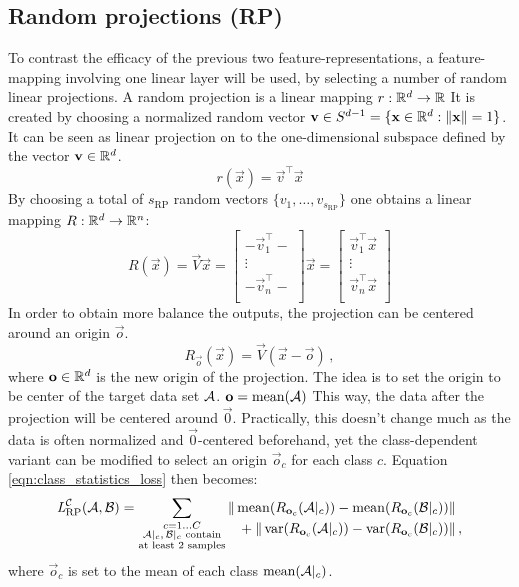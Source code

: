 \subsection{Random projections (RP)}
To contrast the efficacy of the previous two feature-representations,
a feature-mapping involving one linear layer will be used, by selecting a number of  random linear projections.
A random projection is a linear mapping $r: \mathbb{R}^d \to \mathbb{R}$
It is created by choosing a normalized random vector $\mathbf v \in S^{d-1} = \{\mathbf x \in \mathbb{R}^d : \|\mathbf x\| = 1\}$.
It can be seen as  linear projection on to the one-dimensional subspace defined by the vector $\mathbf v \in \mathbb{R}^d$.
\[
    r(\vec x) = \vec v ^\top \vec x
\]
By choosing a total of $s_\text{RP}$ random vectors $\{v_1, \dots, v_{s_\text{RP}}\}$ one obtains a linear mapping $R: \mathbb{R}^d \to \mathbb{R}^n$:
\[
    R(\vec x) = \vec V \vec x =
    \begin{bmatrix}
        - \vec v_1 ^\top - \\
        \vdots \\
        - \vec v_n ^\top - \\
    \end{bmatrix}
    \vec x =
    \begin{bmatrix}
        \vec v_1 ^\top \vec x \\
        \vdots \\
        \vec v_n ^\top \vec x \\
    \end{bmatrix}
\]
%
In order to obtain more balance the outputs,
the projection can be centered around an origin $\vec o$.
% 
\[
    R_{\vec o} (\vec x) = \vec V (\vec x - \vec o) \,,
\]
where $\mathbf o \in \mathbb{R}^d$ is the new origin of the projection. 
The idea is to set the origin to be center of the target data set $\mathcal A$. $\mathbf o = \operatorname{mean} (\mathcal A)$
This way, the data after the projection will be centered around $\vec 0$.
Practically, this doesn't change much as the data is often normalized and $\vec 0$-centered beforehand,
yet the class-dependent variant can be modified to select an origin $\vec o_c$ for each class $c$.
Equation \ref{eqn:class_statistics_loss} then becomes:
% 
\begin{equation*}
    \textit{L} _{\text{RP}} ^{\mathcal C} (\mathcal A, \mathcal B) =
    \sum _{\substack{c = 1 \dots C \\ \mathcal A|_c,\, \mathcal B|_c \text{ contain} \\ \text{at least 2 samples}}}
    \begin{alignedat}[t]{1}
        \|\operatorname{mean} ({R_{\mathbf o_c} (\mathcal A|_c)}) - \operatorname{mean} ({R_{\mathbf o_c} (\mathcal B|_c)}) &\| \\
        {} + \|\operatorname{var} ({R_{\mathbf o_c} (\mathcal A|_c)}) - \operatorname{var} ({R_{\mathbf o_c} (\mathcal B|_c)}) &\|  \,,
    \end{alignedat}
\end{equation*}
%
where $\vec o_c$ is set to the mean of each class $\operatorname{mean} ({\mathcal A|_c})$.


